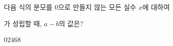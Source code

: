 \hspace*{2mm}\begin{minipage}[t]{\dimexpr\linewidth-2mm\relax}\vspace{0pt}
다음 식의 분모를 $0$으로 만들지 않는 모든 실수 $x$에 대하여 \par\smallskip{}\par\smallskip{}\par\smallskip\noindent 가 성립할 때, $a-b$의 값은? 
\begin{choices32}{$0$}{$2$}{$4$}{$6$}{$8$}\end{choices32}\end{minipage}

